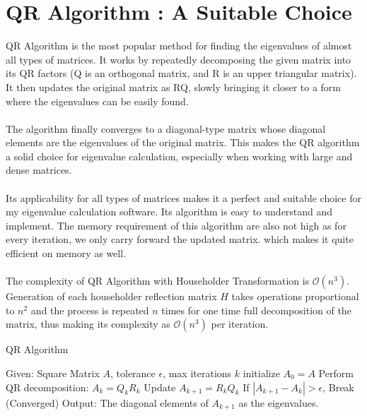 \documentclass{article}
\begin{document}
\section{QR Algorithm : A Suitable Choice}\cite{youtubeQR}
QR Algorithm is the most popular method for finding the eigenvalues of almost all types of matrices. It works by repeatedly decomposing the given matrix into its QR factors (Q is an  orthogonal matrix, and R is an upper triangular matrix). It then updates the original matrix as RQ, slowly bringing it closer to a form where the eigenvalues can be easily found.
\paragraph{} The algorithm finally converges to a diagonal-type matrix whose diagonal elements are the eigenvalues of the original matrix. This makes the QR algorithm a solid choice for eigenvalue calculation, especially when working with large and dense matrices.
\paragraph{} Its applicability for all types of matrices makes it a perfect and suitable choice for my eigenvalue calculation software. Its algorithm is easy to understand and implement. The memory requirement of this algorithm are also not high as for every iteration, we only carry forward the updated matrix. which makes it quite efficient on memory as well.
\paragraph{}The complexity of QR Algorithm with Householder Transformation is $\mathcal{O}(n^3)$. Generation of each householder reflection matrix $H$ takes operations proportional to $n^2$ and the process is repeated $n$ times for one time full decomposition of the matrix, thus making its complexity as $\mathcal{O}(n^3)$ per iteration.

\begin{algorithm}[H]
    \caption{QR Algorithm}
    \begin{algorithmic}[1]
        \Statex Given: Square Matrix $A$, tolerance $\epsilon$, max iterations $k$
        \Statex
        \State initialize $A_0 = A$
        \State Perform QR decomposition: $A_k = Q_k R_k$
        \State Update $A_{k+1} = R_k Q_k$
        \State If $|A_{k+1} - A_k| > \epsilon$, Break (Converged)
        \EndFor
        \Statex
        \Statex Output: The diagonal elements of $A_{k+1}$ as the eigenvalues.
    \end{algorithmic}
\end{algorithm}
\end{document}
